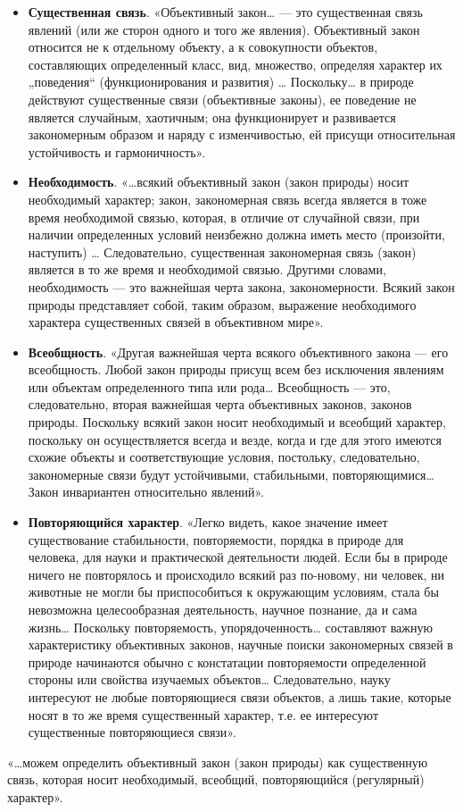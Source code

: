 \documentclass[11pt,a4paper]{article}
\begin{document}
\begin{itemize}
\item \textbf{Существенная связь}. «Объективный закон… — это существенная
  связь явлений (или же сторон одного и того же явления). Объективный закон
  относится не к отдельному объекту, а к совокупности объектов, составляющих
  определенный класс, вид, множество, определяя характер их „поведения“
  (функционирования и развития) … Поскольку… в природе действуют существенные
  связи (объективные законы), ее поведение не является случайным, хаотичным;
  она функционирует и развивается закономерным образом и наряду с
  изменчивостью, ей присущи относительная устойчивость и гармоничность».
\item \textbf{Необходимость}. «…всякий объективный закон (закон природы) носит
  необходимый характер; закон, закономерная связь всегда является в тоже время
  необходимой связью, которая, в отличие от случайной связи, при наличии
  определенных условий неизбежно должна иметь место (произойти, наступить) …
  Следовательно, существенная закономерная связь (закон) является в то же
  время и необходимой связью. Другими словами, необходимость — это важнейшая
  черта закона, закономерности. Всякий закон природы представляет собой, таким
  образом, выражение необходимого характера существенных связей в объективном
  мире».
\item \textbf{Всеобщность}. «Другая важнейшая черта всякого объективного
  закона — его всеобщность. Любой закон природы присущ всем без исключения
  явлениям или объектам определенного типа или рода… Всеобщность — это,
  следовательно, вторая важнейшая черта объективных законов, законов природы.
  Поскольку всякий закон носит необходимый и всеобщий характер, поскольку он
  осуществляется всегда и везде, когда и где для этого имеются схожие объекты
  и соответствующие условия, постольку, следовательно, закономерные связи
  будут устойчивыми, стабильными, повторяющимися… Закон инвариантен
  относительно явлений».
\item \textbf{Повторяющийся характер}. «Легко видеть, какое значение имеет
  существование стабильности, повторяемости, порядка в природе для человека,
  для науки и практической деятельности людей. Если бы в природе ничего не
  повторялось и происходило всякий раз по-новому, ни человек, ни животные не
  могли бы приспособиться к окружающим условиям, стала бы невозможна
  целесообразная деятельность, научное познание, да и сама жизнь… Поскольку
  повторяемость, упорядоченность… составляют важную характеристику объективных
  законов, научные поиски закономерных связей в природе начинаются обычно с
  констатации повторяемости определенной стороны или свойства изучаемых
  объектов…  Следовательно, науку интересуют не любые повторяющиеся связи
  объектов, а лишь такие, которые носят в то же время существенный характер,
  т.е. ее интересуют существенные повторяющиеся связи».
\end{itemize}
«…можем определить объективный закон (закон природы) как существенную связь,
которая носит необходимый, всеобщий, повторяющийся (регулярный) характер».
\end{document}
